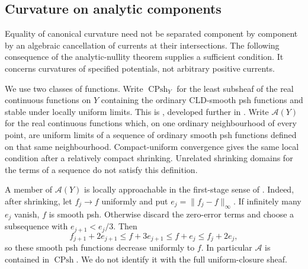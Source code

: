 \subsection{Curvature on analytic components}
\label{sec:ch14-component-curvature}

Equality of canonical curvature need not be separated component by component
by an algebraic cancellation of currents at their intersections.  The
following consequence of the analytic-nullity theorem
\cite[Corollary~16.9.4]{CLD25} supplies a sufficient condition.  It concerns
curvatures of specified potentials, not arbitrary positive currents.

We use two classes of functions.  Write
$\operatorname{CPsh}_Y$ for the least subsheaf of the real continuous
functions on $Y$ containing the ordinary CLD-smooth psh functions and stable
under locally uniform limits.  This is
\cite[Definition~8.1.7 and Lemma~8.1.8]{CLD25}, developed further in
.
Write $\mathscr A(Y)$ for the real continuous functions which, on one
ordinary neighbourhood of every point, are uniform limits of a sequence of
ordinary smooth psh functions defined on that same neighbourhood.
Compact-uniform convergence gives the same local condition after a
relatively compact shrinking.  Unrelated shrinking domains for the terms
of a sequence do not satisfy this definition.

A member of $\mathscr A(Y)$ is locally approachable in the first-stage
sense of \cite[Definition~8.1.13]{CLD25}.  Indeed, after shrinking, let
$f_j\to f$ uniformly and put $e_j=\|f_j-f\|_\infty$.  If infinitely many
$e_j$ vanish, $f$ is smooth psh.  Otherwise discard the zero-error terms
and choose a subsequence with $e_{j+1}<e_j/3$.  Then
\[
 f_{j+1}+2e_{j+1}
 \leq f+3e_{j+1}
 \leq f+e_j
 \leq f_j+2e_j,
\]
so these smooth psh functions decrease uniformly to $f$.  In particular
$\mathscr A$ is contained in $\operatorname{CPsh}$.  We do not identify it
with the full uniform-closure sheaf.

